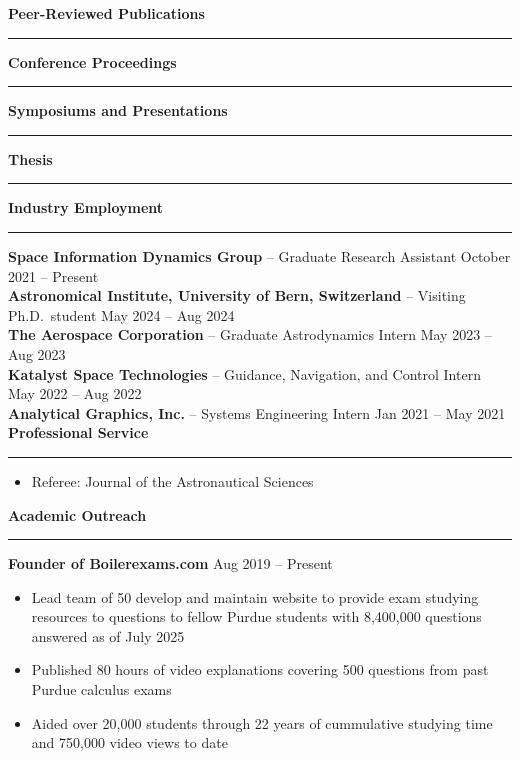 \documentclass[10pt, a4paper]{article}
\newcommand{\sectiontitle}[1]{{\Large \textbf{#1}}\vspace{0.5em}\hrule\vspace{0.5em}}
\begin{document}
\nocite{*}
\sectiontitle{Peer-Reviewed Publications}
\printbibliography[heading=none, keyword={journal}, resetnumbers=true]

\nocite{*}
\sectiontitle{Conference Proceedings}
\printbibliography[heading=none, keyword={conference}, resetnumbers=true]

\nocite{*}
\sectiontitle{Symposiums and Presentations}
\printbibliography[heading=none, keyword={presentations}, resetnumbers=true]

\nocite{*}
\sectiontitle{Thesis}
\printbibliography[heading=none, keyword={thesis}, resetnumbers=true]



\sectiontitle{Industry Employment}
\textbf{Space Information Dynamics Group} -- Graduate Research Assistant \hfill October 2021 -- Present \\
\textbf{Astronomical Institute, University of Bern, Switzerland} -- Visiting Ph.D.\ student \hfill May 2024 -- Aug 2024 \\
\textbf{The Aerospace Corporation} -- Graduate Astrodynamics Intern \hfill May 2023 -- Aug 2023 \\
\textbf{Katalyst Space Technologies} -- Guidance, Navigation, and Control Intern \hfill May 2022 -- Aug 2022 \\
\textbf{Analytical Graphics, Inc.} -- Systems Engineering Intern \hfill Jan 2021 -- May 2021 \\

\sectiontitle{Professional Service}

\begin{itemize}[noitemsep]
  \item Referee: Journal of the Astronautical Sciences
\end{itemize}

\sectiontitle{Academic Outreach}
\textbf{Founder of Boilerexams.com} \hfill Aug 2019 -- Present \\
\begin{itemize}[noitemsep]
    \item Lead team of 50 develop and maintain website to provide exam studying resources to questions to fellow Purdue students with 8,400,000 questions answered as of July 2025
    \item Published 80 hours of video explanations covering 500 questions from past Purdue calculus exams
    \item Aided over 20,000 students through 22 years of cummulative studying time and 750,000 video views to date
\end{itemize}


\end{document}

